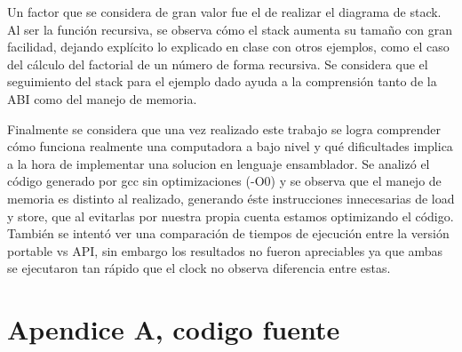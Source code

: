\documentclass[a4paper,10pt]{article}
\begin{document}
Un factor que se considera de gran valor fue el de realizar el diagrama de stack. Al ser la función recursiva, se observa cómo el stack aumenta su tamaño con gran facilidad, dejando explícito lo explicado en clase con otros ejemplos, como el caso del cálculo del factorial de un número de forma recursiva. Se considera que el seguimiento del stack para el ejemplo dado ayuda a la comprensión tanto de la ABI como del manejo de memoria.

Finalmente se considera que una vez realizado este trabajo se logra comprender cómo funciona realmente una computadora a bajo nivel y qué dificultades implica a la hora de implementar una solucion en lenguaje ensamblador. Se analizó el código generado por gcc sin optimizaciones (-O0) y se observa que el manejo de memoria es distinto al realizado, generando éste instrucciones innecesarias
de load y store, que al evitarlas por nuestra propia cuenta estamos optimizando el código. También se intentó ver una comparación de tiempos de ejecución entre la versión portable vs API, sin embargo los resultados no fueron apreciables ya que ambas se ejecutaron tan rápido que el clock no observa diferencia entre estas.

\section{Apendice A, codigo fuente}
\end{document}
